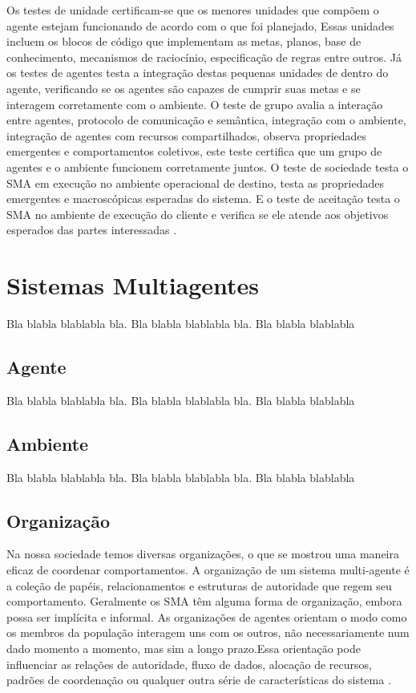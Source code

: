 \documentclass[dm,ppgcomp]{texfurg} %
\begin{document}
Os testes de unidade certificam-se que os menores unidades que compõem o agente estejam funcionando de acordo com o que foi planejado, Essas unidades incluem os blocos de código que implementam as metas, planos, base de conhecimento, mecanismos de raciocínio, especificação de regras entre outros. Já os testes de agentes testa a integração destas pequenas unidades de dentro do agente, verificando se os agentes são capazes de cumprir suas metas e se interagem corretamente com o ambiente. O teste de grupo avalia a interação entre agentes, protocolo de comunicação e semântica, integração com o ambiente, integração de agentes com recursos compartilhados, observa propriedades emergentes e comportamentos coletivos, este teste certifica que um grupo de agentes e o ambiente funcionem corretamente juntos. O teste de sociedade testa o SMA em execução no ambiente operacional de destino, testa as propriedades emergentes e macroscópicas esperadas do sistema. E o teste de aceitação testa o SMA no ambiente de execução do cliente e verifica se ele atende aos objetivos esperados das partes interessadas \cite{nguyen2009thesis}.

\section{Sistemas Multiagentes}

  Bla blabla blablabla bla.  Bla blabla blablabla bla.  Bla blabla blablabla


\subsection{Agente}

  Bla blabla blablabla bla.  Bla blabla blablabla bla.  Bla blabla blablabla


\subsection{Ambiente}

  Bla blabla blablabla bla.  Bla blabla blablabla bla.  Bla blabla blablabla


\subsection{Organização}

  Na nossa sociedade temos diversas organizações, o que se mostrou uma maneira eficaz de coordenar comportamentos. A organização de um sistema multi-agente é a coleção de papéis, relacionamentos e estruturas de autoridade que regem seu comportamento. Geralmente os SMA têm alguma forma de organização, embora possa ser implícita e informal. As organizações de agentes orientam o modo como os membros da população interagem uns com os outros, não necessariamente num dado momento a momento, mas sim a longo prazo.Essa orientação pode influenciar as relações de autoridade, fluxo de dados, alocação de recursos, padrões de coordenação ou qualquer outra série de características do sistema \cite{horling2004survey}.
\end{document}
